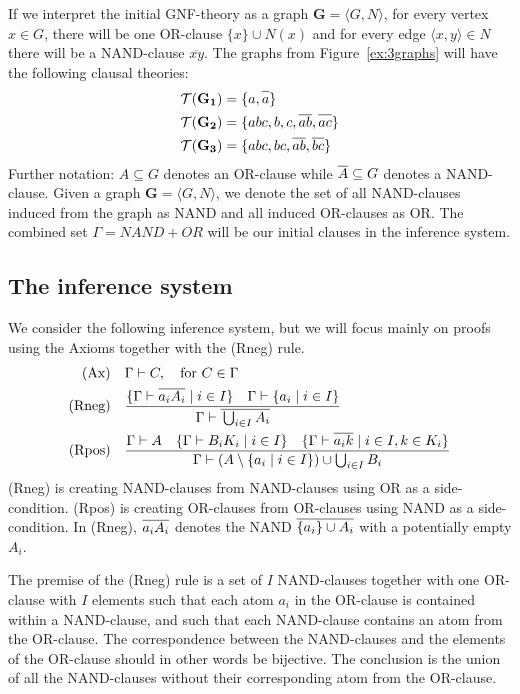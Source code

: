 If we interpret the initial GNF-theory as a graph $\mathbf{G}=\langle G,N\rangle$, for every vertex $x \in G$, there will be one OR-clause $\{ x \} \cup N(x)$ and for every edge $\langle x,y \rangle \in N$ there will be a NAND-clause $\overline{xy}$.
The graphs from Figure~\ref{ex:3graphs} will have the following clausal theories:
\begin{align}
  \mathcal{T}(\mathbf{G_1}) &= \{ a, \ol{a} \}\\
  \mathcal{T}(\mathbf{G_2}) &= \{ abc, b, c, \ol{ab}, \ol{ac} \}\\
  \mathcal{T}(\mathbf{G_3}) &= \{ abc, bc, \ol{ab}, \ol{bc} \}
\end{align}
Further notation: $A\subseteq G$ denotes an OR-clause while $\ol{A} \subseteq G$ denotes a NAND-clause.
Given a graph $\mathbf{G}=\langle G,N\rangle$, we denote the set of all NAND-clauses induced from the graph as NAND and all induced OR-clauses as OR.
The combined set $\Gamma = NAND + OR$ will be our initial clauses in the inference system.
\subsection{The inference system}
\label{sub:The inference system}
We consider the following inference system, but we will focus mainly on proofs using the Axioms together with the (Rneg) rule.
\begin{align}
  \text{(Ax)} &\quad \Gamma \vdash C, \quad \text{for } C \in \Gamma\\
  \text{(Rneg)} &\quad \frac{ \{ \Gamma \vdash \ol{a_iA_i} \; |\; i \in I \} \quad \Gamma \vdash \{ a_i \; |\; i \in I \} }{ \Gamma \vdash \ol{\bigcup_{i \in I} A_i} }\\
  \text{(Rpos)} &\quad \frac{ \Gamma \vdash A \quad \{\Gamma \vdash B_iK_i \; |\; i \in I \} \quad \{ \Gamma \vdash \ol{a_ik} \; |\; i \in I, k \in K_i \} }{ \Gamma \vdash (A \setminus \{ a_i \; |\; i \in I \} ) \cup \bigcup_{i \in I} B_i }
\end{align}
(Rneg) is creating NAND-clauses from NAND-clauses using OR as a side-condition.
(Rpos) is creating OR-clauses from OR-clauses using NAND as a side-condition.
In (Rneg), $\ol{a_iA_i}$ denotes the NAND $\ol{\{ a_i \} \cup A_i}$ with a potentially empty $A_i$.

The premise of the (Rneg) rule is a set of $I$ NAND-clauses together with one OR-clause with $I$ elements such that each atom $a_i$ in the OR-clause is contained within a NAND-clause, and such that each NAND-clause contains an atom from the OR-clause.
The correspondence between the NAND-clauses and the elements of the OR-clause should in other words be bijective.
The conclusion is the union of all the NAND-clauses without their corresponding atom from the OR-clause.

